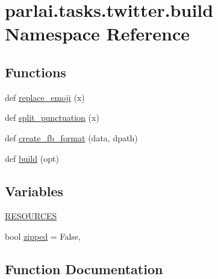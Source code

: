 \hypertarget{namespaceparlai_1_1tasks_1_1twitter_1_1build}{}\section{parlai.\+tasks.\+twitter.\+build Namespace Reference}
\label{namespaceparlai_1_1tasks_1_1twitter_1_1build}
\subsection*{Functions}
\begin{DoxyCompactItemize}
\item 
def \hyperlink{namespaceparlai_1_1tasks_1_1twitter_1_1build_aea2acf2542f3fb1294fa121bb7cb1a76}{replace\+\_\+emoji} (x)
\item 
def \hyperlink{namespaceparlai_1_1tasks_1_1twitter_1_1build_a6296215f669301c1e46b7588e1291ae7}{split\+\_\+punctuation} (x)
\item 
def \hyperlink{namespaceparlai_1_1tasks_1_1twitter_1_1build_ab36b25b09bea28cdf3278f910e5e9ff6}{create\+\_\+fb\+\_\+format} (data, dpath)
\item 
def \hyperlink{namespaceparlai_1_1tasks_1_1twitter_1_1build_a8faa6a4ae6f2adaa22f068cc6781898d}{build} (opt)
\end{DoxyCompactItemize}
\subsection*{Variables}
\begin{DoxyCompactItemize}
\item 
\hyperlink{namespaceparlai_1_1tasks_1_1twitter_1_1build_abba1eb3a3cdb532a871ad3e5038c065b}{R\+E\+S\+O\+U\+R\+C\+ES}
\item 
bool \hyperlink{namespaceparlai_1_1tasks_1_1twitter_1_1build_a450f6716ab61ba4f1227e35f897d58da}{zipped} = False,
\end{DoxyCompactItemize}


\subsection{Function Documentation}
\mbox{\label{namespaceparlai_1_1tasks_1_1twitter_1_1build_a8faa6a4ae6f2adaa22f068cc6781898d}} 
